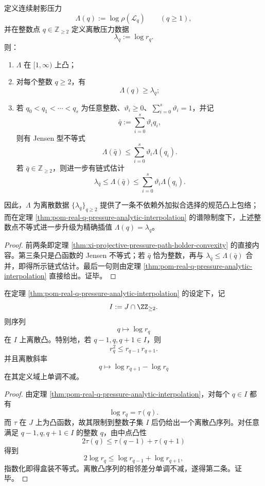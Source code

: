 \begin{theorem}\label{thm:xi-projective-pressure-canonical-convex-majorant}
定义连续射影压力
\[
\Lambda(q):=\log \rho(\mathcal L_q)
\qquad(q\ge 1),
\]
并在整数点 \(q\in\mathbb Z_{\ge 2}\) 定义离散压力数据
\[
\lambda_q:=\log r_q.
\]
则：
\begin{enumerate}
  \item \(\Lambda\) 在 \([1,\infty)\) 上凸；
  \item 对每个整数 \(q\ge 2\)，有
  \[
  \Lambda(q)\ge \lambda_q;
  \]
  \item 若 \(q_0<q_1<\cdots<q_s\) 为任意整数、\(\vartheta_i\ge 0\)、\(\sum_{i=0}^s\vartheta_i=1\)，并记
  \[
  \bar q:=\sum_{i=0}^s \vartheta_i q_i,
  \]
  则有 Jensen 型不等式
  \[
  \Lambda(\bar q)\le \sum_{i=0}^s \vartheta_i \Lambda(q_i).
  \]
  若 \(\bar q\in\mathbb Z_{\ge 2}\)，则进一步有链式估计
  \[
  \lambda_{\bar q}\le \Lambda(\bar q)\le \sum_{i=0}^s \vartheta_i \Lambda(q_i).
  \]
\end{enumerate}
因此，\(\Lambda\) 为离散数据 \(\{\lambda_q\}_{q\ge 2}\) 提供了一条不依赖外加拟合选择的规范凸上包络；而在定理 \ref{thm:pom-real-q-pressure-analytic-interpolation} 的谱隙制度下，上述整数点不等式进一步升级为精确插值 \(\Lambda(q)=\lambda_q\)。
\end{theorem}
\begin{proof}
前两条即定理 \ref{thm:xi-projective-pressure-path-holder-convexity} 的直接内容。第三条只是凸函数的 Jensen 不等式；若 \(\bar q\) 恰为整数，再与 \(\lambda_{\bar q}\le \Lambda(\bar q)\) 合并，即得所示链式估计。最后一句则由定理 \ref{thm:pom-real-q-pressure-analytic-interpolation} 直接给出。证毕。
\end{proof}

\begin{corollary}\label{cor:xi-projective-pressure-integer-logconvex-under-interpolation}
在定理 \ref{thm:pom-real-q-pressure-analytic-interpolation} 的设定下，记
\[
I:=J\cap\ZZ_{\ge 2}.
\]
则序列
\[
q\longmapsto \log r_q
\]
在 \(I\) 上离散凸。特别地，若 \(q-1,q,q+1\in I\)，则
\[
\boxed{\;
r_q^2\le r_{q-1}\,r_{q+1}.\;}
\]
并且离散斜率
\[
q\longmapsto \log r_{q+1}-\log r_q
\]
在其定义域上单调不减。
\end{corollary}
\begin{proof}
由定理 \ref{thm:pom-real-q-pressure-analytic-interpolation}，对每个 \(q\in I\) 都有
\[
\log r_q=\tau(q).
\]
而 \(\tau\) 在 \(J\) 上为凸函数，故其限制到整数子集 \(I\) 后仍给出一个离散凸序列。对任意满足 \(q-1,q,q+1\in I\) 的整数 \(q\)，由中点凸性
\[
2\tau(q)\le \tau(q-1)+\tau(q+1)
\]
得到
\[
2\log r_q\le \log r_{q-1}+\log r_{q+1},
\]
指数化即得盒装不等式。离散凸序列的相邻差分单调不减，遂得第二条。证毕。
\end{proof}

